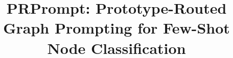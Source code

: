 \documentclass[10pt,twocolumn]{article}
\title{PRPrompt: Prototype-Routed Graph Prompting for Few-Shot Node Classification}
\author{}
\date{}
\begin{document}
\maketitle

\FloatBarrier
\begingroup
\footnotesize
\raggedright


\endgroup
\appendix
\small

\end{document}
